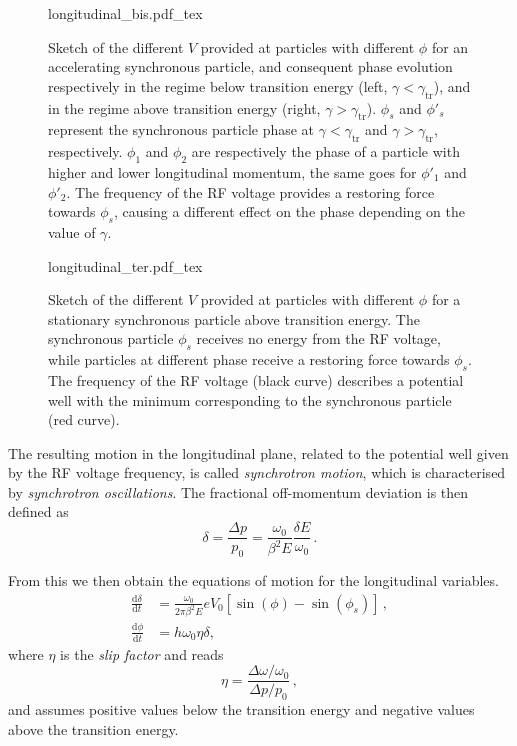 \begin{figure}[p]
    \centering
    \def\svgwidth{0.85\columnwidth}
    {longitudinal_bis.pdf_tex}
    \caption{Sketch of the different $V$ provided at particles with different $\phi$ for an accelerating synchronous particle, and consequent phase evolution respectively in the regime below transition energy (left, $\gamma < \gamma_\text{tr}$), and in the regime above transition energy (right, $\gamma > \gamma_\text{tr}$). $\phi_s$ and $\phi'_s$ represent the synchronous particle phase at $\gamma < \gamma_\text{tr}$ and $\gamma > \gamma_\text{tr}$, respectively. $\phi_1$ and $\phi_2$ are respectively the phase of a particle with higher and lower longitudinal momentum, the same goes for $\phi'_1$ and $\phi'_2$. The frequency of the RF voltage provides a restoring force towards $\phi_s$, causing a different effect on the phase depending on the value of $\gamma$.}
    \label{fig:long_1}

    \vspace{\floatsep}
    
    \def\svgwidth{0.85\columnwidth}
    {longitudinal_ter.pdf_tex}
    \caption{Sketch of the different $V$ provided at particles with different $\phi$ for a stationary synchronous particle above transition energy. The synchronous particle $\phi_s$ receives no energy from the RF voltage, while particles at different phase receive a restoring force towards $\phi_s$. The frequency of the RF voltage (black curve) describes a potential well with the minimum corresponding to the synchronous particle (red curve).}
    \label{fig:long_2}
\end{figure}

The resulting motion in the longitudinal plane, related to the potential well given by the RF voltage frequency, is called \textit{synchrotron motion}, which is characterised by \textit{synchrotron oscillations}. The fractional off-momentum deviation is then defined as
\begin{equation}
    \delta=\frac{\Delta p}{p_0}=\frac{\omega_0}{\beta^2 E} \frac{\delta E}{\omega_0} \,.
\end{equation}

From this we then obtain the equations of motion for the longitudinal variables.
\begin{equation}
    \begin{aligned}
    \frac{\mathrm{d} \delta}{\mathrm{d} t} &=\frac{\omega_0}{2 \pi \beta^2 E} e V_0\left[\sin (\phi)-\sin \left(\phi_s\right)\right] \,, \\
    \frac{\mathrm{d} \phi}{\mathrm{d} t} &=h \omega_0 \eta \delta,
    \end{aligned}
\end{equation}
where $\eta$ is the \textit{slip factor} and reads
\begin{equation}
    \eta=\frac{\Delta \omega / \omega_0}{\Delta p / p_0} \,,
\end{equation}
and assumes positive values below the transition energy and negative values above the transition energy.

